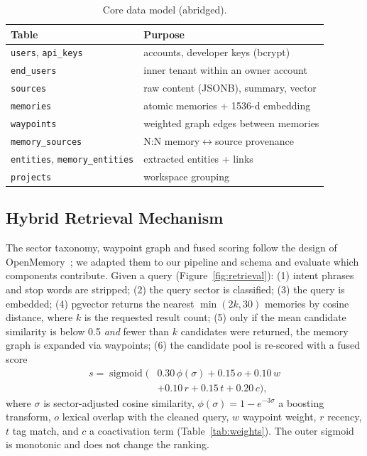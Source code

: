 \documentclass[conference]{IEEEtran}
\begin{document}
\begin{table}[t]
\caption{Core data model (abridged).}
\label{tab:schema}
\centering
\footnotesize
\begin{tabular}{@{}ll@{}}
\toprule
Table & Purpose \\
\midrule
\texttt{users}, \texttt{api\_keys} & accounts, developer keys (bcrypt) \\
\texttt{end\_users} & inner tenant within an owner account \\
\texttt{sources} & raw content (JSONB), summary, vector \\
\texttt{memories} & atomic memories + 1536-d embedding \\
\texttt{waypoints} & weighted graph edges between memories \\
\texttt{memory\_sources} & N:N memory$\leftrightarrow$source provenance \\
\texttt{entities}, \texttt{memory\_entities} & extracted entities + links \\
\texttt{projects} & workspace grouping \\
\bottomrule
\end{tabular}
\end{table}

\subsection{Hybrid Retrieval Mechanism}
\label{sec:retrieval}
The sector taxonomy, waypoint graph and fused scoring follow the design of
OpenMemory~\cite{openmemory}; we adapted them to our pipeline and schema and
evaluate which components contribute. Given a query (Figure~\ref{fig:retrieval}): (1) intent phrases and stop words are
stripped; (2) the query sector is classified; (3) the query is embedded; (4)
pgvector returns the nearest $\min(2k,30)$ memories by cosine distance, where $k$
is the requested result count; (5) only if the mean candidate similarity is below
0.5 \emph{and} fewer than $k$ candidates were returned, the memory graph is
expanded via waypoints; (6) the candidate pool is re-scored with a fused score
\begin{equation}
\begin{split}
s = \operatorname{sigmoid}\big(&0.30\,\phi(\sigma) + 0.15\,o + 0.10\,w \\
 &+ 0.10\,r + 0.15\,t + 0.20\,c\big),
\end{split}
\end{equation}
where $\sigma$ is sector-adjusted cosine similarity,
$\phi(\sigma)=1-e^{-3\sigma}$ a boosting transform, $o$ lexical overlap with the
cleaned query, $w$ waypoint weight, $r$ recency, $t$ tag match, and $c$ a
coactivation term (Table~\ref{tab:weights}). The outer sigmoid is monotonic and
does not change the ranking.
\end{document}
